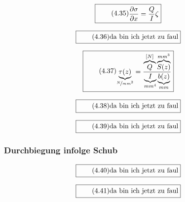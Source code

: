 \documentclass[11pt]{article}
\newcommand{\1}{ {\mathds{1}} }
\begin{document}
		\begin{equation}
			\boxed{
				\tag{4.35}
				\begin{split}
					\frac{\partial \sigma}{\partial x} = \frac{Q}{I} \zeta
				\end{split}
			}
		\end{equation}

		\begin{equation}
			\boxed{
				\tag{4.36}
				\begin{split}
					\text{da bin ich jetzt zu faul}
				\end{split}
			}
		\end{equation}

		\begin{equation}
			\boxed{
				\tag{4.37}
				\begin{split}
					\underbrace{\tau(z)}_{\nicefrac{N}{mm^2}} = \frac{\overbrace{Q}^{[N]}\overbrace{S(z)}^{mm^3}}{\underbrace{I}_{mm^4}\underbrace{b(z)}_{mm}}
				\end{split}
			}
		\end{equation}

		\begin{equation}
			\boxed{
				\tag{4.38}
				\begin{split}
					\text{da bin ich jetzt zu faul}
				\end{split}
			}
		\end{equation}

		\begin{equation}
			\boxed{
				\tag{4.39}
				\begin{split}
					\text{da bin ich jetzt zu faul}
				\end{split}
			}
		\end{equation}
		
		\subsubsection{Durchbiegung infolge Schub}

		\begin{equation}
			\boxed{
				\tag{4.40}
				\begin{split}
					\text{da bin ich jetzt zu faul}
				\end{split}
			}
		\end{equation}

		\begin{equation}
			\boxed{
				\tag{4.41}
				\begin{split}
					\text{da bin ich jetzt zu faul}
				\end{split}
			}
		\end{equation}
\end{document}
